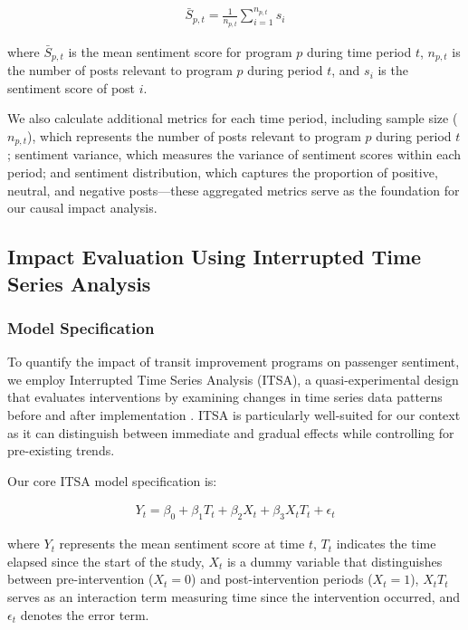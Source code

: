 \documentclass[a4paper,fleqn,12pt]{cas-sc}
\begin{document}
\begin{align}
\bar{S}_{p,t} = \frac{1}{n_{p,t}} \sum_{i=1}^{n_{p,t}} s_i
\end{align}

where $\bar{S}_{p,t}$ is the mean sentiment score for program $p$ during time period $t$, $n_{p,t}$ is the number of posts relevant to program $p$ during period $t$, and $s_i$ is the sentiment score of post $i$.

We also calculate additional metrics for each time period, including sample size ($n_{p,t}$), which represents the number of posts relevant to program $p$ during period $t$; sentiment variance, which measures the variance of sentiment scores within each period; and sentiment distribution, which captures the proportion of positive, neutral, and negative posts—these aggregated metrics serve as the foundation for our causal impact analysis.

\subsection{Impact Evaluation Using Interrupted Time Series Analysis}

\subsubsection{Model Specification}

To quantify the impact of transit improvement programs on passenger sentiment, we employ Interrupted Time Series Analysis (ITSA), a quasi-experimental design that evaluates interventions by examining changes in time series data patterns before and after implementation \citep{bernal2017interrupted}. ITSA is particularly well-suited for our context as it can distinguish between immediate and gradual effects while controlling for pre-existing trends.

Our core ITSA model specification is:

\begin{align}
Y_t = \beta_0 + \beta_1 T_t + \beta_2 X_t + \beta_3 X_t T_t + \epsilon_t
\end{align}

where $Y_t$ represents the mean sentiment score at time $t$, $T_t$ indicates the time elapsed since the start of the study, $X_t$ is a dummy variable that distinguishes between pre-intervention ($X_t = 0$) and post-intervention periods ($X_t = 1$), $X_t T_t$ serves as an interaction term measuring time since the intervention occurred, and $\epsilon_t$ denotes the error term.
\end{document}
